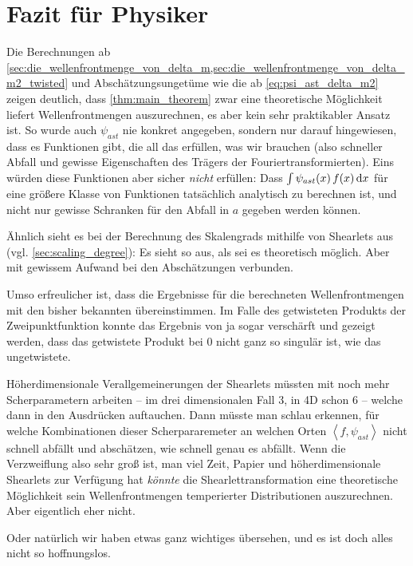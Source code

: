 
\section{Fazit für Physiker} %
\label{sec:fazit_fuer_physiker}

Die Berechnungen ab \cref{sec:die_wellenfrontmenge_von_delta_m,sec:die_wellenfrontmenge_von_delta_m2_twisted} und Abschätzungsungetüme wie die ab \cref{eq:psi_ast_delta_m2} zeigen deutlich, dass \cref{thm:main_theorem} zwar eine theoretische Möglichkeit liefert Wellenfrontmengen auszurechnen, es aber kein sehr praktikabler Ansatz ist. So wurde auch $\psi_{ast}$ nie konkret angegeben, sondern nur darauf hingewiesen, dass es Funktionen gibt, die all das erfüllen, was wir brauchen (also schneller Abfall und gewisse Eigenschaften des Trägers der Fouriertransformierten). Eins würden diese Funktionen aber sicher \emph{nicht} erfüllen: Dass $\int \psi_{ast}(x)\,f(x) \mathop{}\!\mathrm{d} x$ für eine größere Klasse von Funktionen tatsächlich analytisch zu berechnen ist, und nicht nur gewisse Schranken für den Abfall in $a$ gegeben werden können.

Ähnlich sieht es bei der Berechnung des Skalengrads mithilfe von Shearlets aus (vgl. \cref{sec:scaling_degree}): Es sieht so aus, als sei es theoretisch möglich. Aber mit gewissem Aufwand bei den Abschätzungen verbunden.

Umso erfreulicher ist, dass die Ergebnisse für die berechneten Wellenfrontmengen mit den bisher bekannten übereinstimmen. Im Falle des getwisteten Produkts der Zweipunktfunktion konnte das Ergebnis von \textcite{Schulz2014} ja sogar verschärft und gezeigt werden, dass das getwistete Produkt bei $0$ nicht ganz so singulär ist, wie das ungetwistete.

Höherdimensionale Verallgemeinerungen der Shearlets müssten mit noch mehr Scherparametern arbeiten -- im drei dimensionalen Fall 3, in 4D schon  6 -- welche dann in den Ausdrücken auftauchen. Dann müsste man schlau erkennen, für welche Kombinationen dieser Scherpararemeter an welchen Orten $\left< f, \psi_{ast} \right>$ nicht schnell abfällt und abschätzen, wie schnell genau es abfällt.
Wenn die Verzweiflung also sehr groß ist, man viel Zeit, Papier und höherdimensionale Shearlets zur Verfügung hat \emph{könnte} die Shearlettransformation eine theoretische Möglichkeit sein Wellenfrontmengen temperierter Distributionen auszurechnen. Aber eigentlich eher nicht.

Oder natürlich wir haben etwas ganz wichtiges übersehen, und es ist doch alles nicht so hoffnungslos.

